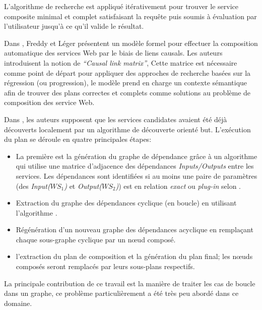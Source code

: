   L'algorithme de recherche est appliqué itérativement pour trouver le
  service composite minimal et complet satisfaisant la requête puis
  soumis à évaluation par l'utilisateur jusqu'à ce qu'il valide le
  résultat.\bigskip

  Dans \cite{lecue2006formal}, Freddy et Léger présentent un modèle
  formel pour effectuer la composition automatique des services Web par
  le biais de liens causals. Les auteurs introduisent la notion de
  \textit{``Causal link matrix''}, Cette matrice est nécessaire comme
  point de départ pour appliquer des approches de recherche basées sur
  la régression (ou progression), le modèle prend en charge un
  contexte sémantique afin de trouver des plans correctes et complets
  comme solutions au problème de composition des service Web.\bigskip

  Dans \cite{omer2009dependency}, les auteurs supposent que les
  services candidates avaient été déjà découverts localement par un
  algorithme de découverte orienté but. L'exécution du plan se déroule
  en quatre principales étapes:

  \SpecialItem
  \begin{itemize}
  \item La première est la génération du graphe de dépendance grâce à
    un algorithme qui utilise une matrice d'adjacence des dépendances
    \textit{Inputs/Outputs} entre les services. Les dépendances sont
    identifiées si au moins une paire de paramètres (des
    \textit{Input($WS_1$)} et \textit{Output($WS_2$)}) est en
    relation \textit{exact} ou \textit{plug-in} selon
    \cite{paolucci2002semantic}.

  \item Extraction du graphe des dépendances cyclique (en boucle) en
    utilisant l'algorithme \cite{tarjan1973enumeration}.

  \item Régénération d'un nouveau graphe des dépendances acyclique en
    remplaçant chaque sous-graphe cyclique par un nœud composé.

  \item l'extraction du plan de composition et la génération du plan
    final; les nœuds composés seront remplacés par leurs sous-plans
    respectifs.\medskip
  \end{itemize}
  \enddescription

  La principale contribution de ce travail est la manière de traiter
  les cas de boucle dans un graphe, ce problème particulièrement a été
  très peu abordé dans ce domaine.\bigskip

